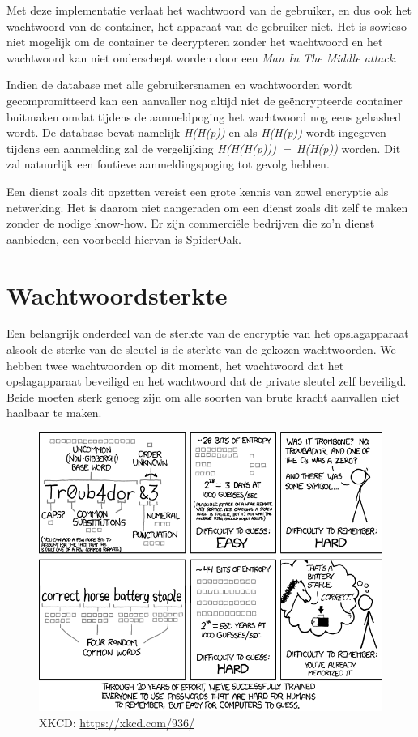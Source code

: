Met deze implementatie verlaat het wachtwoord van de gebruiker, en dus ook het
wachtwoord van de container, het apparaat van de gebruiker niet. Het is sowieso
niet mogelijk om de container te decrypteren zonder het wachtwoord en het
wachtwoord kan niet onderschept worden door een \textit{Man In The Middle attack}.

Indien de database met alle gebruikersnamen en wachtwoorden wordt
gecompromitteerd kan een aanvaller nog altijd niet de geëncrypteerde container
buitmaken omdat tijdens de aanmeldpoging het wachtwoord nog eens gehashed wordt.
De database bevat namelijk \textit{H(H(p))} en als \textit{H(H(p))} wordt
ingegeven tijdens een aanmelding zal de vergelijking \textit{H(H(H(p)))~=~H(H(p))} worden. Dit zal natuurlijk een foutieve aanmeldingspoging tot gevolg hebben.

Een dienst zoals dit opzetten vereist een grote kennis van zowel encryptie als
netwerking. Het is daarom niet aangeraden om een dienst zoals dit zelf te maken
zonder de nodige know-how. Er zijn commerciële bedrijven die zo’n dienst
aanbieden, een voorbeeld hiervan is SpiderOak.

\section{Wachtwoordsterkte}
\label{sec:wachtwoordsterkte}

Een belangrijk onderdeel van de sterkte van de encryptie van het opslagapparaat
alsook de sterke van de sleutel is de sterkte van de gekozen wachtwoorden. We
hebben twee wachtwoorden op dit moment, het wachtwoord dat het opslagapparaat
beveiligd en het wachtwoord dat de private sleutel zelf beveiligd. Beide moeten
sterk genoeg zijn om alle soorten van brute kracht aanvallen niet haalbaar te
maken.

\begin{figure}[H]
	\includegraphics[width=\textwidth,keepaspectratio]{img/password-strength-xkcd.png}
	\centering
	\caption{XKCD: \url{https://xkcd.com/936/}}
	\label{fig:wachtwoord-sterkte-xkcd}
\end{figure}

